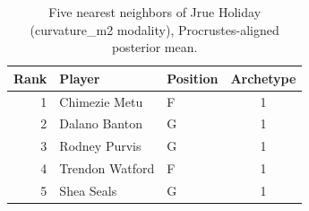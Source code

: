 \begin{table}[htbp]
  \centering\small
  \begin{tabular}{rllc}
    \toprule
    Rank & Player & Position & Archetype \\
    \midrule
    1 & Chimezie Metu & F & 1 \\
    2 & Dalano Banton & G & 1 \\
    3 & Rodney Purvis & G & 1 \\
    4 & Trendon Watford & F & 1 \\
    5 & Shea Seals & G & 1 \\
    \bottomrule
  \end{tabular}
  \caption{Five nearest neighbors of Jrue Holiday (curvature_m2 modality), Procrustes-aligned posterior mean.}
  \label{tab:Jrue_Holiday_neighbors_curvature_m2}
\end{table}

